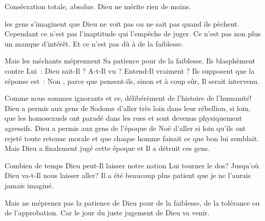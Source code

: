 Consécration totale, absolue. Dieu ne mérite rien de moins. 

\dvrule






 les gens s'imaginent que Dieu ne voit pas
 ou ne sait pas quand ils pèchent.
 Cependant ce n'est pas l'inaptitude qui l'empêche de juger.
 Ce n'est pas non plus un manque d'intérêt.
 Et ce n'est pas dû à de la faiblesse.


Mais les méchants méprennent Sa patience pour de la faiblesse.
 Ils blasphèment contre Lui~:
 \og Dieu sait-Il ? A-t-Il vu ? Entend-Il vraiment ? \fg{}
 Ils supposent que la réponse est~: \og Non \fg{},
 parce que pensent-ils, sinon et à coup sûr, Il serait intervenu.

Comme nous sommes ignorants \ocadr et ce, délibérément \fcadr{}
 de l'histoire de l'humanité!
 Dieu a permis aux gens de Sodome d'aller très loin dans leur rébellion,
 si loin, que les homosexuels ont paradé dans les rues et sont devenus
 physiquement agressifs.
 Dieu a permis aux gens de l'époque de Noé d'aller si loin qu'ils ont
 rejeté toute retenue morale et que chaque homme faisait ce que bon
 lui semblait.
 Mais Dieu a finalement jugé cette époque et Il a détruit ces gens.

Combien de temps Dieu peut-Il laisser notre nation Lui tourner le dos?
 Jusqu'où Dieu va-t-Il nous laisser aller?
 Il a été beaucoup plus patient que je ne l'aurais jamais imaginé.

Mais ne méprenez pas la patience de Dieu pour de la faiblesse,
 de la tolérance ou de l'approbation.
 Car le jour du juste jugement de Dieu va venir.

\dvrule



